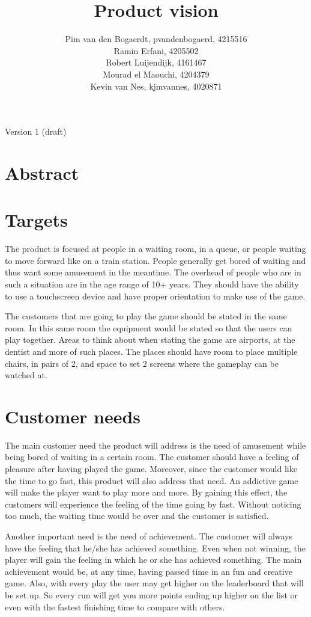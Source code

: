 \documentclass[12pt,twoside,a4paper]{article}
\title{Product vision}
\author{
	Pim van den Bogaerdt, pvandenbogaerd, 4215516\\
	Ramin Erfani, 4205502\\
	Robert Luijendijk, 4161467\\
	Mourad el Maouchi, 4204379\\
	Kevin van Nes, kjmvannes, 4020871
}
\begin{document}
\maketitle
\begin{center}
Version 1 (draft)
\end{center}
\clearpage

\section*{Abstract}


\clearpage
\tableofcontents

\clearpage

\section{Targets}
The product is focused at people in a waiting room, in a queue, or people waiting to move forward like on a train station. People generally get bored of waiting and thus want some amusement in the meantime. The overhead of people who are in such a situation are in the age range of 10+ years. They should have the ability to use a touchscreen device and have proper orientation to make use of the game.

The customers that are going to play the game should be stated in the same room. In this same room the equipment would be stated so that the users can play together. Areas to think about when stating the game are airports, at the dentist and more of such places. The places should have room to place multiple chairs, in pairs of 2, and space to set 2 screens where the gameplay can be watched at. 

\section{Customer needs}
The main customer need the product will address is the need of amusement while being bored of waiting in a certain room. The customer should have a feeling of pleasure after having played the game. Moreover, since the customer would like the time to go fast, this product will also address that need. An addictive game will make the player want to play more and more. By gaining this effect, the customers will experience the feeling of the time going by fast. Without noticing too much, the waiting time would be over and the customer is satisfied.

Another important need is the need of achievement. The customer will always have the feeling that he/she has achieved something. Even when not winning, the player will gain the feeling in which he or she has achieved something. The main achievement would be, at any time, having passed time in an fun and creative game. Also, with every play the user may get higher on the leaderboard that will be set up. So every run will get you more points ending up higher on the list or even with the fastest finishing time to compare with others.
\end{document}
